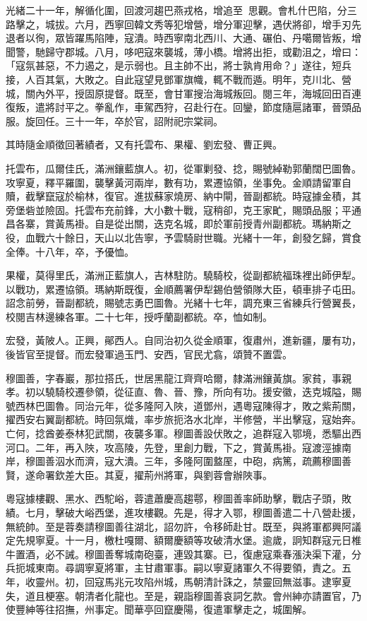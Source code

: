 \begin{pinyinscope}
光緒二十一年，解循化圍，回渡河趨巴燕戎格，增追至思觀。會札什巴陷，分三路擊之，城拔。六月，西寧回韓文秀等犯增營，增分軍迎擊，遇伏將卻，增手刃先退者以徇，眾皆躍馬陷陣，寇潰。時西寧南北西川、大通、碾伯、丹噶爾皆叛，增聞警，馳歸守郡城。八月，哆吧寇來襲城，薄小橋。增將出拒，或勸沮之，增曰：「寇氛甚惡，不力遏之，是示弱也。且主帥不出，將士孰肯用命？」遂往，短兵接，人百其氣，大敗之。自此寇望見鄧軍旗幟，輒不戰而遁。明年，克川北、營城，關內外平，授固原提督。既至，會甘軍搜治海城叛回。閱三年，海城回田百連復叛，遣將討平之。拳亂作，車駕西狩，召赴行在。回鑾，節度隨扈諸軍，晉頭品服。旋回任。三十一年，卒於官，詔附祀宗棠祠。

其時隨金順徵回著績者，又有托雲布、果權、劉宏發、曹正興。

托雲布，瓜爾佳氏，滿洲鑲藍旗人。初，從軍剿發、捻，賜號綽勒郭蘭闊巴圖魯。攻寧夏，釋平羅圍，襲擊黃河兩岸，數有功，累遷協領，坐事免。金順請留軍自贖，截擊竄寇於榆林，復官。進拔蘇家燒房、納中閘，晉副都統。時寇據金積，其旁堡砦並險固。托雲布充前鋒，大小數十戰，寇稍卻，克王家甿，賜頭品服；平通昌各寨，賞黃馬褂。自是從出關，迭克名城，即於軍前授青州副都統。瑪納斯之役，血戰六十餘日，天山以北告寧，予雲騎尉世職。光緒十一年，創發乞歸，賞食全俸。十八年，卒，予優恤。

果權，莫得里氏，滿洲正藍旗人，吉林駐防。驍騎校，從副都統福珠裡出師伊犁。以戰功，累遷協領。瑪納斯既復，金順薦署伊犁錫伯營領隊大臣，頓車排子屯田。詔念前勞，晉副都統，賜號志勇巴圖魯。光緒十七年，調充東三省練兵行營翼長，校閱吉林邊練各軍。二十七年，授呼蘭副都統。卒，恤如制。

宏發，黃陂人。正興，鄖西人。自同治初久從金順軍，復肅州，進新疆，屢有功，後皆官至提督。而宏發軍過玉門、安西，官民尤翕，頌贊不置雲。

穆圖善，字春巖，那拉搭氏，世居黑龍江齊齊哈爾，隸滿洲鑲黃旗。家貧，事親孝。初以驍騎校遷參領，從征直、魯、晉、豫，所向有功。援安徽，迭克城隘，賜號西林巴圖魯。同治元年，從多隆阿入陜，道鄧州，遇粵寇陳得才，敗之紫荊關，擢西安右翼副都統。時回氛熾，率步旅扼洛水北岸，半修營，半出擊寇，寇始奔。亡何，捻酋姜泰林犯武關，夜襲多軍。穆圖善設伏敗之，追群寇入鄂境，悉驅出西河口。二年，再入陜，攻高陵，先登，里創力戰，下之，賞黃馬褂。寇渡涇據南岸，穆圖善泅水而濟，寇大潰。三年，多隆阿圍盩厔，中砲，病篤，疏薦穆圖善賢，遂命署欽差大臣。其夏，擢荊州將軍，與劉蓉會辦陜事。

粵寇據樓觀、黑水、西駝峪，蓉遣蕭慶高趨鄠，穆圖善率師助擊，戰店子頭，敗績。七月，擊破大峪西堡，進攻樓觀。先是，得才入鄂，穆圖善遣二十八營赴援，無統帥。至是蓉奏請穆圖善往湖北，詔勿許，令移師赴甘。既至，與將軍都興阿議定先規寧夏。十一月，檄杜嘎爾、額爾慶額等攻破清水堡。逾歲，詗知群寇元日椎牛置酒，必不誡。穆圖善奪城南砲臺，連毀其寨。已，復慮寇乘春漲決渠下灌，分兵扼城東南。尋調寧夏將軍，主甘肅軍事。嗣以寧夏諸軍久不得要領，責之。五年，收靈州。初，回寇馬兆元攻陷州城，馬朝清計誅之，禁靈回無滋事。逮寧夏失，道且梗塞。朝清者化龍也。至是，親詣穆圖善哀詞乞款。會州紳亦請置官，乃使豐紳等往招撫，州事定。聞華亭回竄慶陽，復遣軍擊走之，城圍解。


\end{pinyinscope}
